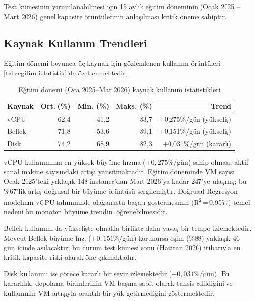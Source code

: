 Test kümesinin yorumlanabilmesi için 15 aylık eğitim döneminin (Ocak 2025 -- Mart 2026) genel kapasite örüntülerinin anlaşılması kritik öneme sahiptir.

\subsection{Kaynak Kullanım Trendleri}

Eğitim dönemi boyunca üç kaynak için gözlemlenen kullanım örüntüleri \autoref{tab:egitim-istatistik}'de özetlenmektedir.

\begin{table}[htbp]
    \centering
    \caption{Eğitim dönemi (Oca 2025--Mar 2026) kaynak kullanım istatistikleri}
    \label{tab:egitim-istatistik}
    \begin{tabular}{lrrrr}
        \textbf{Kaynak} & \textbf{Ort. (\%)} & \textbf{Min. (\%)} & \textbf{Maks. (\%)} & \textbf{Trend} \\
        \hline
        vCPU   & 62{,}4 & 41{,}2 & 83{,}7 & $+$0{,}275\%/gün (yükseliş) \\
        Bellek & 71{,}8 & 53{,}6 & 89{,}1 & $+$0{,}151\%/gün (yükseliş) \\
        Disk   & 74{,}2 & 68{,}9 & 82{,}3 & $+$0{,}031\%/gün (kararlı) \\
    \end{tabular}
\end{table}

vCPU kullanımının en yüksek büyüme hızına (\(+0{,}275\%/\)gün) sahip olması, aktif sanal makine sayısındaki artışı yansıtmaktadır.
Eğitim döneminde VM sayısı Ocak 2025'teki yaklaşık 148 instance'dan Mart 2026'ya kadar 247'ye ulaşmış; bu \%67'lik artış doğrusal bir büyüme örüntüsü sergilemiştir.
Doğrusal Regresyon modelinin vCPU tahmininde olağanüstü başarı göstermesinin (R\textsuperscript{2}\,=\,0{,}9577) temel nedeni bu monoton büyüme trendini öğrenebilmesidir.

Bellek kullanımı da yükselişte olmakla birlikte daha yavaş bir tempo izlemektedir.
Mevcut Bellek büyüme hızı (\(+0{,}151\%/\)gün) korunursa eşim (\%88) yaklaşık 46 gün içinde aşılacaktır; bu durum test kümesi sonu (Haziran 2026) itibarıyla en kritik kapasite riski olarak öne çıkmaktadır.

Disk kullanımı ise görece kararlı bir seyir izlemektedir (\(+0{,}031\%/\)gün).
Bu kararlılık, depolama birimlerinin VM başına sabit olarak tahsis edildiğini ve kullanımın VM artışıyla orantılı bir yük getirmediğini göstermektedir.

